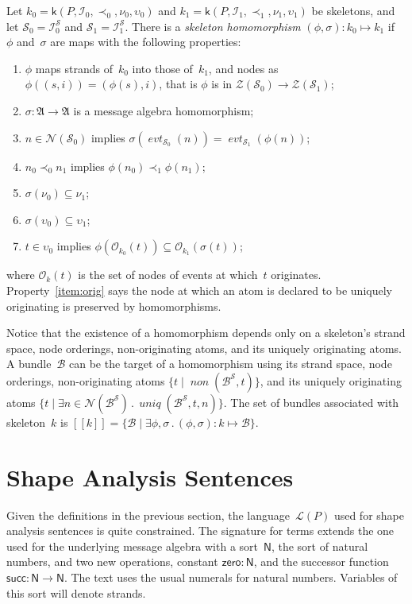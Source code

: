 \documentclass[12pt]{article}
\newcommand{\fn}[1]{\ensuremath{\operatorname{\mathit{#1}}}}
\newcommand{\srt}[1]{\ensuremath{\mathsf{#1}}}
\newcommand{\typ}{\mathbin:}
\newcommand{\some}[1]{\exists#1\mathpunct.}
\newcommand{\alg}[1]{\ensuremath{\mathfrak{#1}}}
\newcommand{\ssp}{\ensuremath{\mathcal{S}}}
\newcommand{\bun}{\ensuremath{\mathcal{B}}}
\newcommand{\strands}{\ensuremath{\mathcal{Z}}}
\newcommand{\nodes}{\ensuremath{\mathcal{N}}}
\newcommand{\lang}{\mathcal{L}}
\newcommand{\skel}{\mathsf{k}}
\newcommand{\insts}{\mathcal{I}}
\newcommand{\evt}{\fn{evt}}
\newcommand{\orig}{\mathcal{O}}
\newcommand{\sembrack}[1]{[\![#1]\!]}
\begin{document}
Let $k_0=\skel(P,\insts_0,\prec_0,\nu_0,\upsilon_0)$ and
$k_1=\skel(P,\insts_1,\prec_1,\nu_1,\upsilon_1)$ be skeletons,
and let $\ssp_0=\insts^\ssp_0$ and $\ssp_1=\insts^\ssp_1$.  There is a
\emph{skeleton homomorphism} $(\phi,\sigma)\colon k_0\mapsto k_1$
if~$\phi$ and~$\sigma$ are maps with the following properties:
\begin{enumerate}
\item $\phi$ maps strands of~$k_0$ into those of~$k_1$, and nodes as
  $\phi((s,i))=(\phi(s),i)$, that is $\phi$ is in
  $\strands(\ssp_0)\to\strands(\ssp_1)$;
\item $\sigma\colon\alg{A}\to\alg{A}$ is a message algebra homomorphism;
\item $n\in\nodes(\ssp_0)$ implies
  $\sigma(\evt_{\ssp_0}(n))=\evt_{\ssp_1}(\phi(n))$;
\item $n_0\prec_0
n_1$ implies $\phi(n_0)\prec_1\phi(n_1)$;
\item $\sigma(\nu_0)\subseteq \nu_1$;
\item $\sigma(\upsilon_0)\subseteq \upsilon_1$;
\item\label{item:orig} $t\in \upsilon_0$ implies
  $\phi(\orig_{k_0}(t))\subseteq\orig_{k_1}(\sigma(t))$;
\end{enumerate}
where $\orig_k(t)$ is the set of nodes of events at which~$t$
originates.  Property~\ref{item:orig} says the node at which an atom
is declared to be uniquely originating is preserved by homomorphisms.

Notice that the existence of a homomorphism depends only on a
skeleton's strand space, node orderings, non-originating atoms, and
its uniquely originating atoms.  A bundle~{\bun} can be the target of
a homomorphism using its strand space, node orderings, non-originating
atoms $\{t\mid \fn{non}(\bun^\ssp,t)\}$, and its uniquely originating
atoms $\{t\mid\some{n\in\nodes(\bun^\ssp)}\fn{uniq}(\bun^\ssp,t,n)\}$.
The set of bundles associated with skeleton~$k$ is
\(\sembrack{k}=\{\bun\mid\some{\phi,\sigma}(\phi,\sigma)\colon
k\mapsto\bun\}.\)

\section{Shape Analysis Sentences}\label{sec:shape analysis sentences}

Given the definitions in the previous section, the language~$\lang(P)$
used for shape analysis sentences is quite constrained.
The signature for terms extends the one used for the underlying
message algebra with a sort~$\srt{N}$, the sort of natural numbers,
and two new operations, constant $\mathsf{zero}\typ\srt{N}$, and the
successor function $\mathsf{succ}\typ\srt{N}\to\srt{N}$.  The text
uses the usual numerals for natural numbers.  Variables of this sort
will denote strands.
\end{document}
